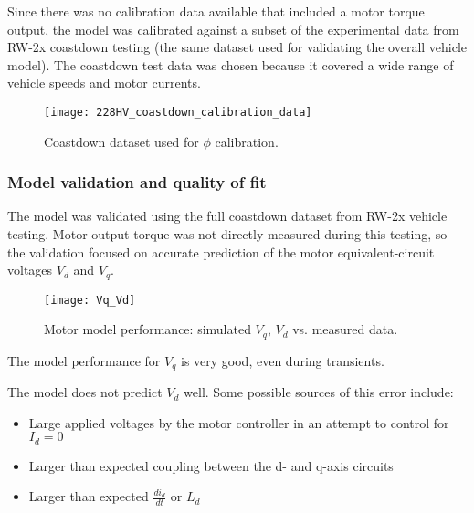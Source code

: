 \documentclass[../SimBALink.tex]{subfiles}
\begin{document}
			Since there was no calibration data available that included a motor torque output, the model was calibrated against a subset of the experimental data from RW-2x coastdown testing (the same dataset used for validating the overall vehicle model). The coastdown test data was chosen because it covered a wide range of vehicle speeds and motor currents.
			
			\begin{figure}[h]
				\centering
				\texttt{[image: 228HV\_coastdown\_calibration\_data]}
				\caption{Coastdown dataset used for $\phi$ calibration.}
			\end{figure}
			\FloatBarrier
			
	\subsubsection{Model validation and quality of fit}
		The model was validated using the full coastdown dataset from RW-2x vehicle testing. Motor output torque was not directly measured during this testing, so the validation focused on accurate prediction of the motor equivalent-circuit voltages $V_d$ and $V_q$. 
		
		\begin{figure}[h]
			\centering
			\texttt{[image: Vq\_Vd]}
			\caption{Motor model performance: simulated $V_q$, $V_d$ vs. measured data.}
		\end{figure}
		\FloatBarrier
		
		The model performance for $V_q$ is very good, even during transients. 
		
		The model does not predict $V_d$ well. Some possible sources of this error include:
		
		\begin{itemize}
			\item		Large applied voltages by the motor controller in an attempt to control for $I_d = 0$
			\item		Larger than expected coupling between the d- and q-axis circuits
			\item		Larger than expected $\frac{d i_d}{d t}$ or $L_d$
		\end{itemize}
		
		
\end{document}
